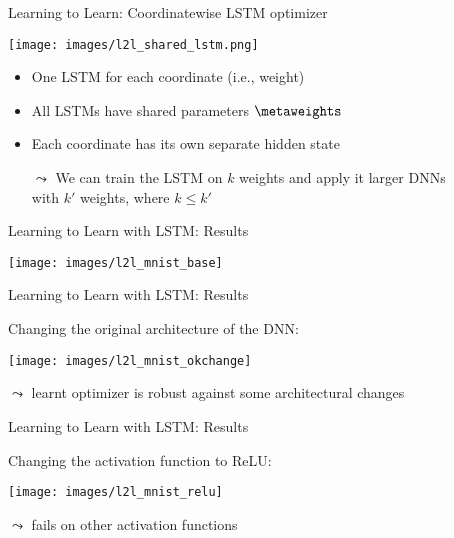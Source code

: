 \begin{frame}[c]{Learning to Learn: Coordinatewise LSTM optimizer }

\centering
\texttt{[image: images/l2l\_shared\_lstm.png]}

\begin{itemize}
\item One LSTM for each coordinate (i.e., weight)
\item All LSTMs have shared parameters $\metaweights$
\item Each coordinate has its own separate hidden state
\pause
\item[$\leadsto$] We can train the LSTM on $k$ weights and apply it larger DNNs\\ with $k'$ weights, where $k \leq k'$
\end{itemize}

\end{frame}
\begin{frame}[c]{Learning to Learn with LSTM: Results }

\centering
\texttt{[image: images/l2l\_mnist\_base]}

\end{frame}
\begin{frame}[c]{Learning to Learn with LSTM: Results }

Changing the original architecture of the DNN:
\smallskip

\centering
\texttt{[image: images/l2l\_mnist\_okchange]}

$\leadsto$ learnt optimizer is robust against some architectural changes

\end{frame}
\begin{frame}[c]{Learning to Learn with LSTM: Results }

Changing the activation function to ReLU:
\smallskip

\centering
\texttt{[image: images/l2l\_mnist\_relu]}

$\leadsto$ fails on other activation functions

\end{frame}

